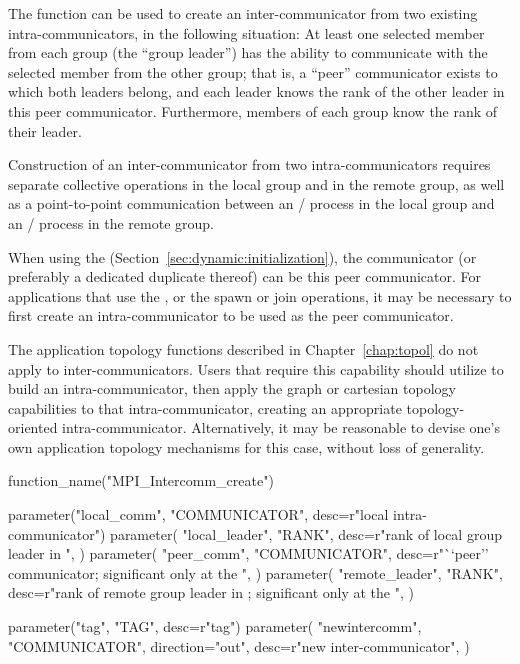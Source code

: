 The function  can be used to create an
inter-communicator from two existing intra-communicators, in the following
situation: At least one selected member from each group (the ``group
leader'') has the ability to communicate with the selected member from
the other group; that is, a ``peer'' communicator exists to which both
leaders belong, and each leader knows the rank of the other leader in
this peer communicator.
Furthermore, members of each group know the rank of their leader.

Construction of an inter-communicator from two intra-communicators requires
separate collective operations in the local group and in the remote group, as
well as a point-to-point communication between an \MPI/ process in the local group
and an \MPI/ process in the remote group.

When using the \wpm{} (Section~\ref{sec:dynamic:initialization}), the 
communicator (or preferably a dedicated duplicate thereof)
can be this peer communicator.
For applications that use the \spm{}, or the spawn or join operations, it may be necessary
to first create an intra-communicator to be used as the peer communicator.

The application topology functions described in Chapter~\ref{chap:topol} do
not apply to inter-communicators. Users that require this capability should
utilize  to build an intra-communicator, then
apply the graph or cartesian topology capabilities to that intra-communicator,
creating an appropriate topology-oriented intra-communicator. Alternatively,
it may be reasonable to devise one's own application topology mechanisms for
this case, without loss of generality.


\begin{mpi-binding}
    function_name("MPI_Intercomm_create")
    
    parameter("local_comm", "COMMUNICATOR", desc=r"local intra-communicator")
    parameter(
        "local_leader",
        "RANK",
        desc=r"rank of local group leader in ",
    )
    parameter(
        "peer_comm",
        "COMMUNICATOR",
        desc=r"``peer'' communicator; significant only at the ",
    )
    parameter(
        "remote_leader",
        "RANK",
        desc=r"rank of remote group leader in ; significant only at the ",
    )
    
    parameter("tag", "TAG", desc=r"tag")
    parameter(
        "newintercomm",
        "COMMUNICATOR",
        direction="out",
        desc=r"new inter-communicator",
    )
\end{mpi-binding}

